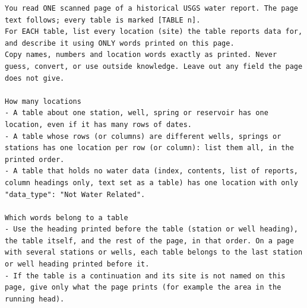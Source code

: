 \begin{lstlisting}
You read ONE scanned page of a historical USGS water report. The page text follows; every table is marked [TABLE n].
For EACH table, list every location (site) the table reports data for, and describe it using ONLY words printed on this page.
Copy names, numbers and location words exactly as printed. Never guess, convert, or use outside knowledge. Leave out any field the page does not give.

How many locations
- A table about one station, well, spring or reservoir has one location, even if it has many rows of dates.
- A table whose rows (or columns) are different wells, springs or stations has one location per row (or column): list them all, in the printed order.
- A table that holds no water data (index, contents, list of reports, column headings only, text set as a table) has one location with only "data_type": "Not Water Related".

Which words belong to a table
- Use the heading printed before the table (station or well heading), the table itself, and the rest of the page, in that order. On a page with several stations or wells, each table belongs to the last station or well heading printed before it.
- If the table is a continuation and its site is not named on this page, give only what the page prints (for example the area in the running head).


\end{lstlisting}
